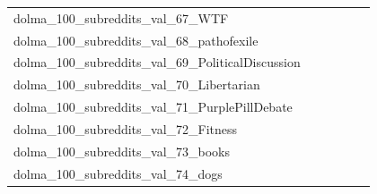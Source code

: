 \documentclass[dvipsnames]{article}
\begin{document}
\begin{appendix}
{\begin{longtable}{m{6cm}m{1.7cm}m{1.7cm}m{1.7cm}m{1.7cm}m{1.7cm}}
	dolma\_100\_subreddits\_val\_67\_WTF  & \colorbox[HTML]{ffffe5}{\makebox[\mywidth][c]{22.30}} & \colorbox[HTML]{dcf1a5}{\makebox[\mywidth][c]{21.18}} & \colorbox[HTML]{ffffe5}{\makebox[\mywidth][c]{22.38}} & \colorbox[HTML]{d8efa2}{\makebox[\mywidth][c]{21.17}} & \colorbox[HTML]{77c578}{\makebox[\mywidth][c]{20.99}}\\
	dolma\_100\_subreddits\_val\_68\_pathofexile  & \colorbox[HTML]{ffffe5}{\makebox[\mywidth][c]{40.48}} & \colorbox[HTML]{aadc8d}{\makebox[\mywidth][c]{38.59}} & \colorbox[HTML]{ffffe5}{\makebox[\mywidth][c]{41.43}} & \colorbox[HTML]{ceeb9e}{\makebox[\mywidth][c]{38.75}} & \colorbox[HTML]{77c578}{\makebox[\mywidth][c]{38.43}}\\
	dolma\_100\_subreddits\_val\_69\_PoliticalDiscussion  & \colorbox[HTML]{ffffe5}{\makebox[\mywidth][c]{20.01}} & \colorbox[HTML]{b8e293}{\makebox[\mywidth][c]{18.92}} & \colorbox[HTML]{ffffe5}{\makebox[\mywidth][c]{20.16}} & \colorbox[HTML]{d1ec9f}{\makebox[\mywidth][c]{18.97}} & \colorbox[HTML]{77c578}{\makebox[\mywidth][c]{18.82}}\\
	dolma\_100\_subreddits\_val\_70\_Libertarian  & \colorbox[HTML]{ffffe5}{\makebox[\mywidth][c]{22.97}} & \colorbox[HTML]{86cc7e}{\makebox[\mywidth][c]{21.77}} & \colorbox[HTML]{ffffe5}{\makebox[\mywidth][c]{23.15}} & \colorbox[HTML]{c1e597}{\makebox[\mywidth][c]{21.87}} & \colorbox[HTML]{77c578}{\makebox[\mywidth][c]{21.75}}\\
	dolma\_100\_subreddits\_val\_71\_PurplePillDebate  & \colorbox[HTML]{ffffe5}{\makebox[\mywidth][c]{24.94}} & \colorbox[HTML]{b0de8f}{\makebox[\mywidth][c]{23.66}} & \colorbox[HTML]{ffffe5}{\makebox[\mywidth][c]{25.44}} & \colorbox[HTML]{e2f3a9}{\makebox[\mywidth][c]{23.85}} & \colorbox[HTML]{77c578}{\makebox[\mywidth][c]{23.55}}\\
	dolma\_100\_subreddits\_val\_72\_Fitness  & \colorbox[HTML]{ffffe5}{\makebox[\mywidth][c]{21.57}} & \colorbox[HTML]{e5f4ab}{\makebox[\mywidth][c]{20.35}} & \colorbox[HTML]{ffffe5}{\makebox[\mywidth][c]{21.48}} & \colorbox[HTML]{e1f3a9}{\makebox[\mywidth][c]{20.34}} & \colorbox[HTML]{77c578}{\makebox[\mywidth][c]{20.11}}\\
	dolma\_100\_subreddits\_val\_73\_books  & \colorbox[HTML]{ffffe5}{\makebox[\mywidth][c]{21.12}} & \colorbox[HTML]{dbf1a4}{\makebox[\mywidth][c]{20.02}} & \colorbox[HTML]{ffffe5}{\makebox[\mywidth][c]{21.31}} & \colorbox[HTML]{e8f6ae}{\makebox[\mywidth][c]{20.09}} & \colorbox[HTML]{77c578}{\makebox[\mywidth][c]{19.82}}\\
	dolma\_100\_subreddits\_val\_74\_dogs  & \colorbox[HTML]{ffffe5}{\makebox[\mywidth][c]{20.13}} & \colorbox[HTML]{def2a6}{\makebox[\mywidth][c]{19.12}} & \colorbox[HTML]{ffffe5}{\makebox[\mywidth][c]{20.32}} & \colorbox[HTML]{edf8b2}{\makebox[\mywidth][c]{19.20}} & \colorbox[HTML]{77c578}{\makebox[\mywidth][c]{18.92}}\\

\end{longtable}}
\end{appendix}
\end{document}
